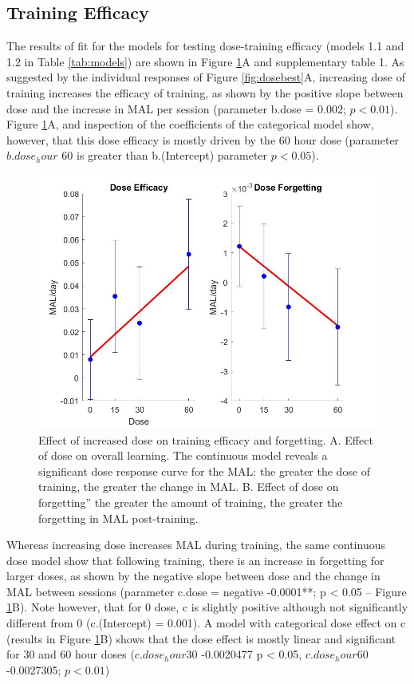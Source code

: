 \subsection{Training Efficacy}
The results of fit for the models for testing dose-training efficacy (models 1.1 and 1.2 in Table \ref{tab:models}) are shown in Figure \ref{fig:doseefficacy}A and supplementary table 1. 
As suggested by the individual responses of Figure \ref{fig:dosebest}A, increasing dose of training increases the efficacy of training, as shown by the positive slope between dose and the increase in MAL per session (parameter b.dose = 0.002; $ p < 0.01 $). 
Figure \ref{fig:doseefficacy}A, and inspection of the coefficients of the categorical model show, however, that this dose efficacy is mostly driven by the 60 hour dose (parameter $ b.dose_hour $ 60 is greater than b.(Intercept) parameter $ p < 0.05 $).

\begin{figure}
	\centering
	\includegraphics[width=0.7\linewidth]{figures/doseEfficacy}
	\caption[Effect of increased dose on training efficacy and forgetting.]{
		Effect of increased dose on training efficacy and forgetting.
		A. Effect of dose on overall learning. The continuous model reveals a significant dose response curve for the MAL: the greater the dose of training, the greater the change in MAL. 
		B. Effect of dose on forgetting” the greater the amount of training, the greater the forgetting in MAL post-training.}
	\label{fig:doseefficacy}
\end{figure}


Whereas increasing dose increases MAL during training, the same continuous dose model show that following training, there is an increase in forgetting for larger doses, as shown by the negative slope between dose and the change in MAL between sessions (parameter c.dose =  negative  -0.0001**; p < 0.05 – Figure \ref{fig:doseefficacy}B). 
Note however, that for 0 dose, c is slightly positive although not significantly different from 0 (c.(Intercept) = 0.001). A model with categorical dose effect on c (results in Figure \ref{fig:doseefficacy}B) shows that the dose effect is mostly linear and significant for 30 and 60 hour doses ($ c.dose_hour30 $  -0.0020477 p <  0.05,  $ c.dose_hour60 $  -0.0027305; $ p < 0.01 $)

